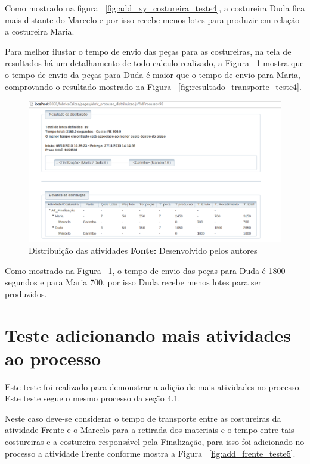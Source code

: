 \par Como mostrado na figura ~\ref{fig:add_xy_costureira_teste4}, a costureira
Duda fica mais distante do Marcelo e por isso recebe menos lotes para produzir em
relação a costureira Maria.

\par Para melhor ilustar o tempo de envio das peças para as costureiras, na tela
de resultados há um detalhamento de todo calculo realizado, a Figura
~\ref{fig:detalhameneto_transporte_teste4} mostra que o tempo de envio da peças para Duda é 
maior que o tempo de envio para Maria, comprovando o resultado mostrado na
Figura ~\ref{fig:resultado_transporte_teste4}.

\begin{figure}[h!]
	\centerline{\includegraphics[scale=0.3]{./imagens/detalhamento_transporte_teste4.png}}
	\caption[Distribuição das atividades]
	{Distribuição das atividades \textbf{Fonte:} Desenvolvido pelos autores}
	\label{fig:detalhameneto_transporte_teste4}
\end{figure}

\par Como mostrado na Figura ~\ref{fig:detalhameneto_transporte_teste4}, o tempo
de envio das peças para Duda é 1800 segundos e para Maria 700, por isso
Duda recebe menos lotes para ser produzidos.


\section{Teste adicionando mais atividades ao processo}

\par Este teste foi realizado para demonstrar a adição de mais atividades no
processo. Este teste segue o mesmo processo da seção 4.1.

\par Neste caso deve-se considerar o tempo de transporte entre as costureiras da atividade Frente e o Marcelo 
para a retirada dos materiais e o tempo entre tais costureiras e a costureira
responsável pela Finalização, para isso foi adicionado no processo a atividade
Frente conforme mostra a Figura ~\ref{fig:add_frente_teste5}.

